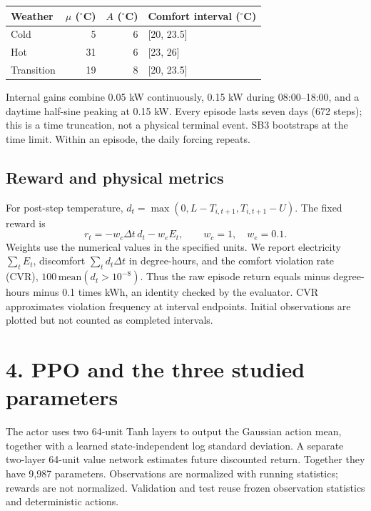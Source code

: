\documentclass[10pt,a4paper]{article}
\begin{document}
\begin{center}
\begin{tabular}{lrrl}
\toprule Weather & $\mu$ ($^\circ$C) & $A$ ($^\circ$C) & Comfort interval ($^\circ$C) \\
\midrule Cold & 5 & 6 & [20, 23.5] \\
Hot & 31 & 6 & [23, 26] \\
Transition & 19 & 8 & [20, 23.5] \\
\bottomrule
\end{tabular}
\end{center}

Internal gains combine 0.05 kW continuously, 0.15 kW during 08:00--18:00, and a daytime half-sine peaking at 0.15 kW. Every episode lasts seven days (672 steps); this is a time truncation, not a physical terminal event. SB3 bootstraps at the time limit. Within an episode, the daily forcing repeats.

\subsection*{Reward and physical metrics}
For post-step temperature, $d_t=\max(0,L-T_{i,t+1},T_{i,t+1}-U)$. The fixed reward is
\begin{equation}
r_t=-w_c\Delta t\,d_t-w_e E_t,\qquad w_c=1,\quad w_e=0.1.
\end{equation}
Weights use the numerical values in the specified units. We report electricity $\sum_tE_t$, discomfort $\sum_td_t\Delta t$ in degree-hours, and the comfort violation rate (CVR), $100\,\mathrm{mean}(d_t>10^{-8})$. Thus the raw episode return equals minus degree-hours minus 0.1 times kWh, an identity checked by the evaluator. CVR approximates violation frequency at interval endpoints. Initial observations are plotted but not counted as completed intervals.
\clearpage

\section*{4. PPO and the three studied parameters}
The actor uses two 64-unit Tanh layers to output the Gaussian action mean, together with a learned state-independent log standard deviation. A separate two-layer 64-unit value network estimates future discounted return. Together they have 9,987 parameters. Observations are normalized with running statistics; rewards are not normalized. Validation and test reuse frozen observation statistics and deterministic actions.
\end{document}
